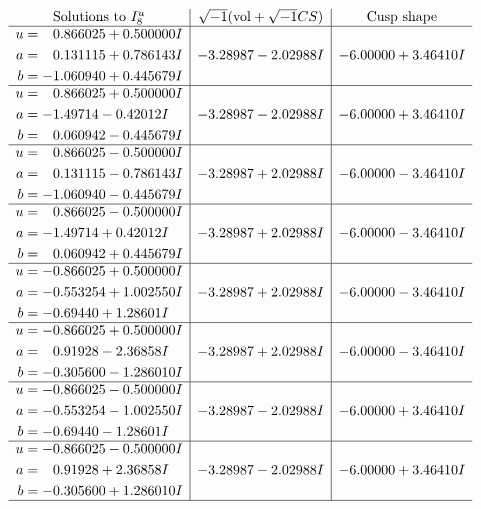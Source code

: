 \documentclass[1p]{elsarticle_modified}
\theoremstyle{definition}
\newcommand{\I}{\sqrt{-1}}
\begin{document}
$$\begin{array}{c|c|c}  
\text{Solutions to }I^u_{8}& \I (\text{vol} + \sqrt{-1}CS) & \text{Cusp shape}\\
 \hline 
\begin{aligned}
u &= \phantom{-}0.866025 + 0.500000 I \\
a &= \phantom{-}0.131115 + 0.786143 I \\
b &= -1.060940 + 0.445679 I\end{aligned}
 & -3.28987 - 2.02988 I & -6.00000 + 3.46410 I \\ \hline\begin{aligned}
u &= \phantom{-}0.866025 + 0.500000 I \\
a &= -1.49714 - 0.42012 I \\
b &= \phantom{-}0.060942 - 0.445679 I\end{aligned}
 & -3.28987 - 2.02988 I & -6.00000 + 3.46410 I \\ \hline\begin{aligned}
u &= \phantom{-}0.866025 - 0.500000 I \\
a &= \phantom{-}0.131115 - 0.786143 I \\
b &= -1.060940 - 0.445679 I\end{aligned}
 & -3.28987 + 2.02988 I & -6.00000 - 3.46410 I \\ \hline\begin{aligned}
u &= \phantom{-}0.866025 - 0.500000 I \\
a &= -1.49714 + 0.42012 I \\
b &= \phantom{-}0.060942 + 0.445679 I\end{aligned}
 & -3.28987 + 2.02988 I & -6.00000 - 3.46410 I \\ \hline\begin{aligned}
u &= -0.866025 + 0.500000 I \\
a &= -0.553254 + 1.002550 I \\
b &= -0.69440 + 1.28601 I\end{aligned}
 & -3.28987 + 2.02988 I & -6.00000 - 3.46410 I \\ \hline\begin{aligned}
u &= -0.866025 + 0.500000 I \\
a &= \phantom{-}0.91928 - 2.36858 I \\
b &= -0.305600 - 1.286010 I\end{aligned}
 & -3.28987 + 2.02988 I & -6.00000 - 3.46410 I \\ \hline\begin{aligned}
u &= -0.866025 - 0.500000 I \\
a &= -0.553254 - 1.002550 I \\
b &= -0.69440 - 1.28601 I\end{aligned}
 & -3.28987 - 2.02988 I & -6.00000 + 3.46410 I \\ \hline\begin{aligned}
u &= -0.866025 - 0.500000 I \\
a &= \phantom{-}0.91928 + 2.36858 I \\
b &= -0.305600 + 1.286010 I\end{aligned}
 & -3.28987 - 2.02988 I & -6.00000 + 3.46410 I\\
 \hline 
 \end{array}$$\newpage\newpage\renewcommand{\arraystretch}{1}
\end{document}
